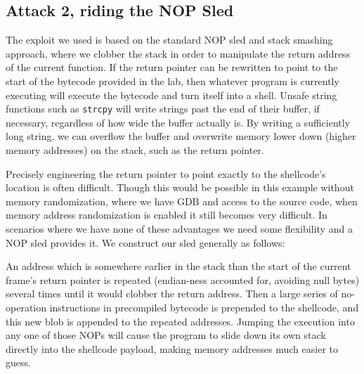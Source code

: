 \subsection{Attack 2, riding the NOP Sled}

The exploit we used is based on the standard NOP sled and stack smashing approach, where we clobber the stack in order
to manipulate the return address of the current function. If the return pointer can be rewritten to point to the start
of the bytecode provided in the lab, then whatever program is currently executing will execute the bytecode and turn
itself into a shell. Unsafe string functions such as {\tt strcpy} will write strings past the end of their buffer, if
necessary, regardless of how wide the buffer actually is. By writing a sufficiently long string, we can overflow the
buffer and overwrite memory lower down (higher memory addresses) on the stack, such as the return pointer.

Precisely engineering the return pointer to point exactly to the shellcode's location is often difficult. Though this
would be possible in this example without memory randomization, where we have GDB and access to the source code, when
memory address randomization is enabled it still becomes very difficult. In scenarios where we have none of these
advantages we need some flexibility and a NOP sled provides it. We construct our sled generally as follows:

An address which is somewhere earlier in the stack than the start of the current frame's return pointer is repeated
(endian-ness accounted for, avoiding null bytes) several times until it would clobber the return address. Then a large
series of no-operation instructions in precompiled bytecode is prepended to the shellcode, and this new blob is appended
to the repeated addresses. Jumping the execution into any one of those NOPs will cause the program to slide down its own
stack directly into the shellcode payload, making memory addresses much easier to guess.

